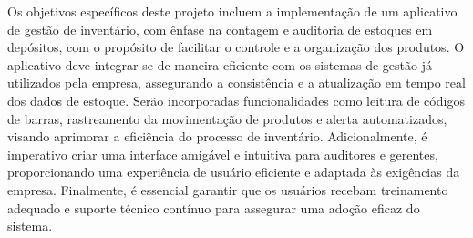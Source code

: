 
Os objetivos específicos deste projeto incluem a implementação de um aplicativo de gestão de inventário, com ênfase na contagem e auditoria de estoques em depósitos, com o propósito de facilitar o controle e a organização dos produtos. O aplicativo deve integrar-se de maneira eficiente com os sistemas de gestão já utilizados pela empresa, assegurando a consistência e a atualização em tempo real dos dados de estoque.
Serão incorporadas funcionalidades como leitura de códigos de barras, rastreamento da movimentação de produtos e alerta automatizados, visando aprimorar a eficiência do processo de inventário. Adicionalmente, é imperativo criar uma interface amigável e intuitiva para auditores e gerentes, proporcionando uma experiência de usuário eficiente e adaptada às exigências da empresa.
Finalmente, é essencial garantir que os usuários recebam treinamento adequado e suporte técnico contínuo para assegurar uma adoção eficaz do sistema.
